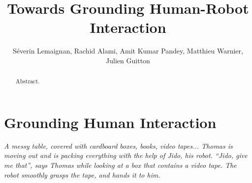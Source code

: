 \documentclass{svmult}
\begin{document}

\title*{Towards Grounding Human-Robot Interaction}

\author{
Séverin Lemaignan,
Rachid Alami,
Amit Kumar Pandey,
Matthieu Warnier,
Julien Guitton
}


\maketitle

\listoffixmes

\clearpage

\setcounter{minitocdepth}{2}
\dominitoc


\begin{abstract}
Abstract. 
\end{abstract}






\section{Grounding Human Interaction}


{\em A messy table, covered with cardboard boxes, books, video tapes... Thomas
is moving out and is packing everything with the help of Jido, his robot.
``Jido, give me that'', says Thomas while looking at a box that contains a
video tape. The robot smoothly grasps the tape, and hands it to him.}
\end{document}
